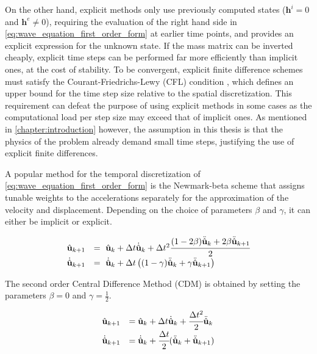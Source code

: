 On the other hand, explicit methods only use previously computed states ($\mathbf h^i = 0$ and $\mathbf h^e \neq 0$), requiring the evaluation of the right hand side in \ref{eq:wave_equation_first_order_form} at earlier time points, and provides an explicit expression for the unknown state. If the mass matrix can be inverted cheaply, explicit time steps can be performed far more efficiently than implicit ones, at the cost of stability. To be convergent, explicit finite difference schemes must satisfy the Courant-Friedrichs-Lewy (CFL) condition \cite{Courant1967}, which defines an upper bound for the time step size relative to the spatial discretization. This requirement can defeat the purpose of using explicit methods in some cases as the computational load per step size may exceed that of implicit ones. As mentioned in \ref{chapter:introduction} however, the assumption in this thesis is that the physics of the problem already demand small time steps, justifying the use of explicit finite differences.

A popular method for the temporal discretization of \ref{eq:wave_equation_first_order_form} is the Newmark-beta scheme \cite{Newmark1959} that assigns tunable weights to the accelerations separately for the approximation of the velocity and displacement. Depending on the choice of parameters $\beta$ and $\gamma$, it can either be implicit or explicit.

\begin{equation}
	\begin{array}{rl}
		\hat{\mathbf{u}}_{k+1} &= \ \hat{\mathbf{u}}_k + \Delta t \dot{\hat{\mathbf{u}}}_k + \Delta t^2
		\cfrac{(1-2 \beta) \ddot{\hat{\mathbf{u}}}_k + 2 \beta \ddot{\hat{\mathbf{u}}}_{k+1}}{2} \\[0.5em]
		\dot{\hat{\mathbf{u}}}_{k+1} &= \ \dot{\hat{\mathbf{u}}}_k + \Delta t \left(
		(1 - \gamma) \ddot{\hat{\mathbf{u}}}_k + \gamma \ddot{\hat{\mathbf{u}}}_{k+1}
		\right) \\
	\end{array}
\end{equation}

The second order Central Difference Method (CDM) is obtained by setting the parameters $\beta=0$ and $\gamma=\frac{1}{2}$.

\begin{equation} \label{eq:central_differences_raw}
	\begin{array}{rl}
		\hat{\mathbf u}_{k+1} &= \hat{\mathbf u}_k + \Delta t \dot{\hat{\mathbf u}}_k + \cfrac{\Delta t^2}{2} \ddot{\hat{\mathbf u}}_k \\
		\dot{\hat{\mathbf u}}_{k+1} &= \dot{\hat{\mathbf u}}_k + \cfrac{\Delta t}{2}( \ddot{\hat{\mathbf u}}_k + \ddot{\hat{\mathbf u}}_{k+1} ) \\
	\end{array}
\end{equation}

